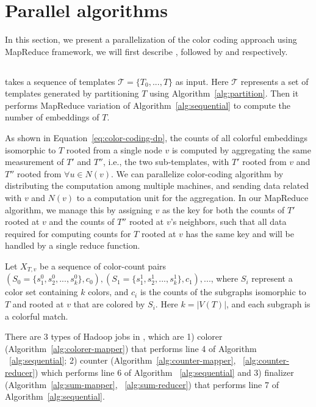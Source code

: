 \section{Parallel algorithms}
\label{sec:parallel}

In this section, we present a parallelization of the color coding approach using
MapReduce framework, we will first describe \sahad{}
\cite{zhao2012sahad}, followed by  \ensahad{} and  \harpsahad{} respectively.

\subsection{\sahad{}}
\label{sec:sahad-implementation}

\sahad{} takes a sequence of templates $\mathcal{T}=\{T_0,...,T\}$ as
input. Here $\mathcal{T}$ represents a set of templates generated by
partitioning $T$ using Algorithm~\ref{alg:partition}. Then it performs MapReduce
variation of Algorithm~\ref{alg:sequential} to compute the number of embeddings
of $T$. 

As shown in Equation~\ref{eq:color-coding-dp}, the counts of all colorful embeddings
isomorphic to $T$ rooted from a single node $v$ is computed by aggregating the
same measurement of $T'$ and $T''$, i.e., the two sub-templates, with $T'$
rooted from $v$ and $T''$ rooted from $\forall u \in N(v)$. We can parallelize
color-coding algorithm by distributing the computation among multiple machines,
and sending data related with $v$ and $N(v)$ to a computation unit for the
aggregation. In our MapReduce algorithm, we manage this by assigning $v$ as the
key for both the counts of $T'$ rooted at $v$ and the counts of $T''$ rooted
at $v$'s neighbors, such that all data required for computing counts for
$T$ rooted at $v$ has the same key and will be handled by a single reduce
function.

Let $X_{T, v}$ be a sequence of color-count
pairs $(S_0=\{s_1^0, s_2^0, ..., s_k^0\}, c_0), (S_1=\{s_1^1, s_2^1, ...,
s_k^1\}, c_1),...$, where $S_i$ represent a color set containing $k$ colors, and
$c_i$ is the counts of the subgraphs isomorphic to $T$ and rooted at $v$ that
are colored by $S_i$. Here $k = |V(T)|$, and each subgraph is a colorful match.

There are 3 types of Hadoop jobs in \sahad{}, which are 1) colorer
(Algorithm~\ref{alg:colorer-mapper}) that performs line 4 of Algorithm
~\ref{alg:sequential}; 2) counter (Algorithm~\ref{alg:counter-mapper},
~\ref{alg:counter-reducer}) which performs line 6 of Algorithm
~\ref{alg:sequential} and 3) finalizer (Algorithm~\ref{alg:sum-mapper},
~\ref{alg:sum-reducer}) that performs line 7 of Algorithm~\ref{alg:sequential}. 

